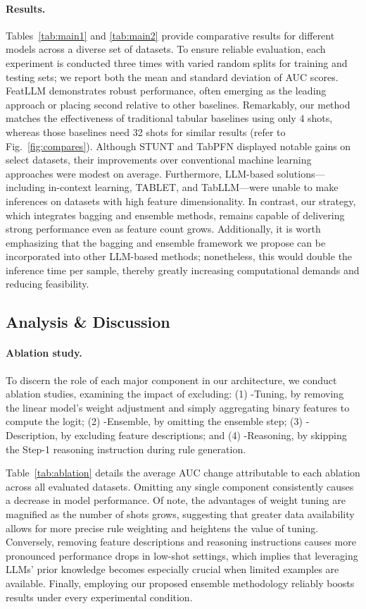 \paragraph{Results.}
Tables~\ref{tab:main1} and \ref{tab:main2} provide comparative results for different models across a diverse set of datasets. To ensure reliable evaluation, each experiment is conducted three times with varied random splits for training and testing sets; we report both the mean and standard deviation of AUC scores. \textsf{FeatLLM} demonstrates robust performance, often emerging as the leading approach or placing second relative to other baselines. Remarkably, our method matches the effectiveness of traditional tabular baselines using only 4 shots, whereas those baselines need 32 shots for similar results (refer to Fig.~\ref{fig:compares}). Although STUNT and TabPFN displayed notable gains on select datasets, their improvements over conventional machine learning approaches were modest on average. Furthermore, LLM-based solutions—including in-context learning, TABLET, and TabLLM—were unable to make inferences on datasets with high feature dimensionality. In contrast, our strategy, which integrates bagging and ensemble methods, remains capable of delivering strong performance even as feature count grows. Additionally, it is worth emphasizing that the bagging and ensemble framework we propose can be incorporated into other LLM-based methods; nonetheless, this would double the inference time per sample, thereby greatly increasing computational demands and reducing feasibility.

\subsection{Analysis \& Discussion}
\label{sec:analysis}
\paragraph{Ablation study.} To discern the role of each major component in our architecture, we conduct ablation studies, examining the impact of excluding: (1) \textsf{-Tuning}, by removing the linear model's weight adjustment and simply aggregating binary features to compute the logit; (2) \textsf{-Ensemble}, by omitting the ensemble step; (3) \textsf{-Description}, by excluding feature descriptions; and (4) \textsf{-Reasoning}, by skipping the Step-1 reasoning instruction during rule generation.

Table~\ref{tab:ablation} details the average AUC change attributable to each ablation across all evaluated datasets. Omitting any single component consistently causes a decrease in model performance. Of note, the advantages of weight tuning are magnified as the number of shots grows, suggesting that greater data availability allows for more precise rule weighting and heightens the value of tuning. Conversely, removing feature descriptions and reasoning instructions causes more pronounced performance drops in low-shot settings, which implies that leveraging LLMs' prior knowledge becomes especially crucial when limited examples are available. Finally, employing our proposed ensemble methodology reliably boosts results under every experimental condition.

